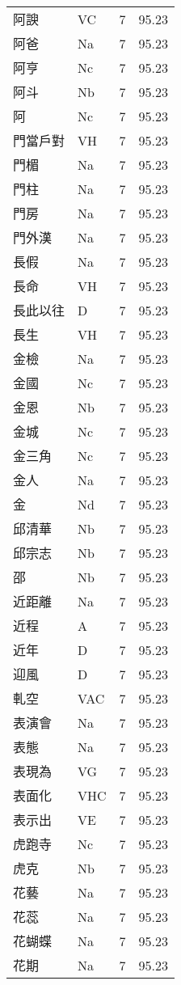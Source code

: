 \documentclass[twocolumn]{book}
\begin{document}
\begin{supertabular}{llrr}
阿諛 & VC & 7 &  95.23\\
阿爸 & Na & 7 &  95.23\\
阿亨 & Nc & 7 &  95.23\\
阿斗 & Nb & 7 &  95.23\\
阿 & Nc & 7 &  95.23\\
門當戶對 & VH & 7 &  95.23\\
門楣 & Na & 7 &  95.23\\
門柱 & Na & 7 &  95.23\\
門房 & Na & 7 &  95.23\\
門外漢 & Na & 7 &  95.23\\
長假 & Na & 7 &  95.23\\
長命 & VH & 7 &  95.23\\
長此以往 & D & 7 &  95.23\\
長生 & VH & 7 &  95.23\\
金檢 & Na & 7 &  95.23\\
金國 & Nc & 7 &  95.23\\
金恩 & Nb & 7 &  95.23\\
金城 & Nc & 7 &  95.23\\
金三角 & Nc & 7 &  95.23\\
金人 & Na & 7 &  95.23\\
金 & Nd & 7 &  95.23\\
邱清華 & Nb & 7 &  95.23\\
邱宗志 & Nb & 7 &  95.23\\
邵 & Nb & 7 &  95.23\\
近距離 & Na & 7 &  95.23\\
近程 & A & 7 &  95.23\\
近年 & D & 7 &  95.23\\
迎風 & D & 7 &  95.23\\
軋空 & VAC & 7 &  95.23\\
表演會 & Na & 7 &  95.23\\
表態 & Na & 7 &  95.23\\
表現為 & VG & 7 &  95.23\\
表面化 & VHC & 7 &  95.23\\
表示出 & VE & 7 &  95.23\\
虎跑寺 & Nc & 7 &  95.23\\
虎克 & Nb & 7 &  95.23\\
花藝 & Na & 7 &  95.23\\
花蕊 & Na & 7 &  95.23\\
花蝴蝶 & Na & 7 &  95.23\\
花期 & Na & 7 &  95.23\\

\end{supertabular}
\end{document}
